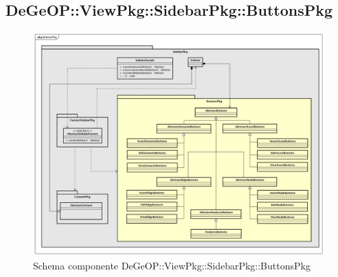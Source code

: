 \subsection{DeGeOP::ViewPkg::SidebarPkg::ButtonsPkg}
\label{pkg::ButtonsPkg}
\begin{figure}[H]
	\centering
	\includegraphics[width=\textwidth]{img/PkgDiagram/ButtonsPkg.png}
	\caption{Schema componente DeGeOP::ViewPkg::SidebarPkg::ButtonsPkg}
\end{figure}

